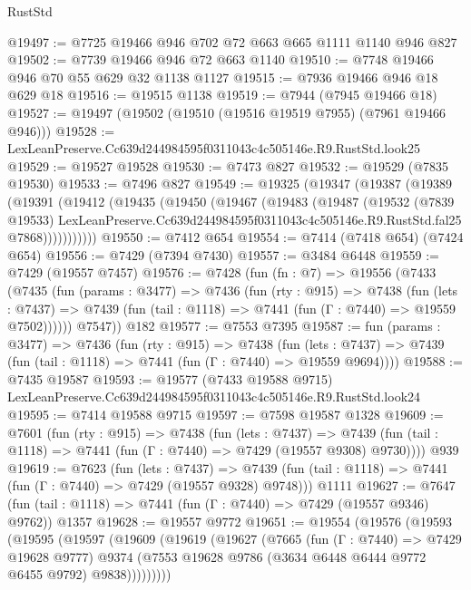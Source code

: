 \begin{lexlean}{RustStd}
\begin{coremodule}
@19497 := @7725 @19466 @946 @702 @72 @663 @665 @1111 @1140 @946 @827
@19502 := @7739 @19466 @946 @72 @663 @1140
@19510 := @7748 @19466 @946 @70 @55 @629 @32 @1138 @1127
@19515 := @7936 @19466 @946 @18 @629 @18
@19516 := @19515 @1138
@19519 := @7944 (@7945 @19466 @18)
@19527 := @19497 (@19502 (@19510 (@19516 @19519 @7955) (@7961 @19466 @946)))
@19528 := LexLeanPreserve.Cc639d244984595f0311043c4c505146e.R9.RustStd.look25
@19529 := @19527 @19528
@19530 := @7473 @827
@19532 := @19529 (@7835 @19530)
@19533 := @7496 @827
@19549 := @19325
    (@19347
      (@19387
        (@19389
          (@19391
            (@19412
              (@19435
                (@19450
                  (@19467
                    (@19483
                      (@19487
                        (@19532
                          (@7839 @19533)
                          LexLeanPreserve.Cc639d244984595f0311043c4c505146e.R9.RustStd.fal25
                          @7868)))))))))))
@19550 := @7412 @654
@19554 := @7414 (@7418 @654) (@7424 @654)
@19556 := @7429 (@7394 @7430)
@19557 := @3484 @6448
@19559 := @7429 (@19557 @7457)
@19576 := @7428
    (fun (fn : @7) =>
    @19556
      (@7433
        (@7435
          (fun (params : @3477) =>
          @7436
            (fun (rty : @915) =>
            @7438
              (fun (lets : @7437) =>
              @7439 (fun (tail : @1118) => @7441 (fun (Γ : @7440) => @19559 @7502))))))
        @7547))
    @182
@19577 := @7553 @7395
@19587 := fun (params : @3477) =>
  @7436
    (fun (rty : @915) =>
    @7438
      (fun (lets : @7437) => @7439 (fun (tail : @1118) => @7441 (fun (Γ : @7440) => @19559 @9694))))
@19588 := @7435 @19587
@19593 := @19577
    (@7433 @19588 @9715)
    LexLeanPreserve.Cc639d244984595f0311043c4c505146e.R9.RustStd.look24
@19595 := @7414 @19588 @9715
@19597 := @7598 @19587 @1328
@19609 := @7601
    (fun (rty : @915) =>
    @7438
      (fun (lets : @7437) =>
      @7439 (fun (tail : @1118) => @7441 (fun (Γ : @7440) => @7429 (@19557 @9308) @9730))))
    @939
@19619 := @7623
    (fun (lets : @7437) =>
    @7439 (fun (tail : @1118) => @7441 (fun (Γ : @7440) => @7429 (@19557 @9328) @9748)))
    @1111
@19627 := @7647 (fun (tail : @1118) => @7441 (fun (Γ : @7440) => @7429 (@19557 @9346) @9762)) @1357
@19628 := @19557 @9772
@19651 := @19554
    (@19576
      (@19593
        (@19595
          (@19597
            (@19609
              (@19619
                (@19627
                  (@7665
                    (fun (Γ : @7440) => @7429 @19628 @9777)
                    @9374
                    (@7553 @19628 @9786 (@3634 @6448 @6444 @9772 @6455 @9792) @9838)))))))))

\end{coremodule}
\end{lexlean}
